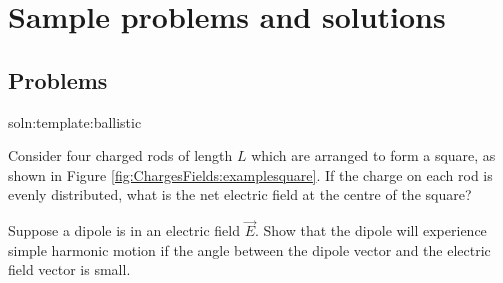 \newpage
\section{Sample problems and solutions}






\subsection{Problems}
\begin{problem}{soln:template:ballistic}{\label{prob:template:ballistic} 
Consider four charged rods of length $L$ which are arranged to form a square, as shown in Figure \ref{fig:ChargesFields:examplesquare}. If the charge on each rod is evenly distributed, what is the net electric field at the centre of the square?

}
\end{problem}

\begin{problem}
	Suppose a dipole is in an electric field $\vec E$. Show that the dipole will experience simple harmonic motion if the angle between the dipole vector and the electric field vector is small.
\end{problem}

\newpage
